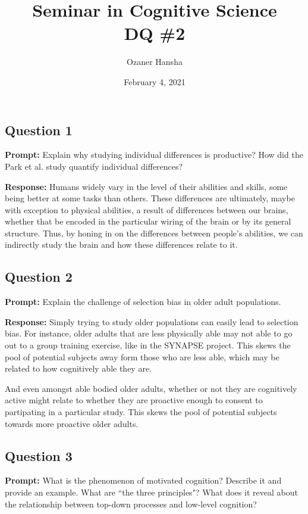 \documentclass{article}
\begin{document}
\title{Seminar in Cognitive Science\\ DQ \#2}
\author{Ozaner Hansha}
\date{February 4, 2021}
\maketitle

\subsection*{Question 1}
\noindent\textbf{Prompt:} Explain why studying individual differences is productive? How did the Park et al. study quantify individual differences?
\bigskip

\noindent\textbf{Response:} Humans widely vary in the level of their abilities and skills, some being better at some tasks than others. These differences are ultimately, maybe with exception to physical abilities, a result of differences between our brains, whether that be encoded in the particular wiring of the brain or by its general structure. Thus, by honing in on the differences between people's abilities, we can indirectly study the brain and how these differences relate to it. 

\subsection*{Question 2}
\noindent\textbf{Prompt:} Explain the challenge of selection bias in older adult populations.
\bigskip

\noindent\textbf{Response:} Simply trying to study older populations can easily lead to selection bias. For instance, older adults that are less physically able may not able to go out to a group training exercise, like in the SYNAPSE project. This skews the pool of potential subjects away form those who are less able, which may be related to how cognitively able they are.

And even amongst able bodied older adults, whether or not they are cognitively active might relate to whether they are proactive enough to consent to partipating in a particular study. This skews the pool of potential subjects towards more proactive older adults.

\subsection*{Question 3}
\noindent\textbf{Prompt:} What is the phenomenon of motivated cognition? Describe it and provide an example. What are ``the three principles"? What does it reveal about the relationship between top-down processes and low-level cognition?
\bigskip
\end{document}

